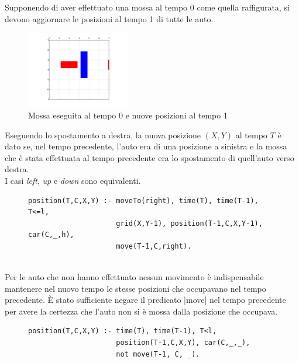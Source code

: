 \documentclass[10pt, a4paper, oneside]{article}
\begin{document}
\noindent
Supponendo di aver effettuato una mossa al tempo 0 come quella raffigurata, si devono aggiornare le posizioni al tempo 1 di tutte le auto.
\begin{figure}[H]
  \centering
  \includegraphics[width=0.4\textwidth]{images/r_right.PNG}
  \caption{Mossa eseguita al tempo 0 e nuove posizioni al tempo 1}
  \label{fig:}
\end{figure}

\noindent
Eseguendo lo spostamento a destra, la nuova posizione $(X,Y)$ al tempo $T$ è dato se, nel tempo precedente, l'auto era di una posizione a sinistra e la mossa che è stata effettuata al tempo precedente era lo spostamento di quell'auto verso destra. \\

\noindent
I casi \emph{left}, \emph{up} e \emph{down} sono equivalenti.

\begin{figure}[H]
\centering
\begin{verbatim}
position(T,C,X,Y) :- moveTo(right), time(T), time(T-1), T<=l, 
                     grid(X,Y-1), position(T-1,C,X,Y-1), car(C,_,h), 
                     move(T-1,C,right).\end{verbatim}
\end{figure}

\noindent
\\Per le auto che non hanno effettuato nessun movimento è indispensabile mantenere nel nuovo tempo le stesse posizioni che occupavano nel tempo precedente. È stato sufficiente negare il predicato |move| nel tempo precedente per avere la certezza che l'auto non si è mossa dalla posizione che occupava.

\begin{figure}[H]
\centering
\begin{verbatim}
position(T,C,X,Y) :- time(T), time(T-1), T<l, 
                     position(T-1,C,X,Y), car(C,_,_), 
                     not move(T-1, C, _).
\end{verbatim}
\end{figure}
\end{document}
